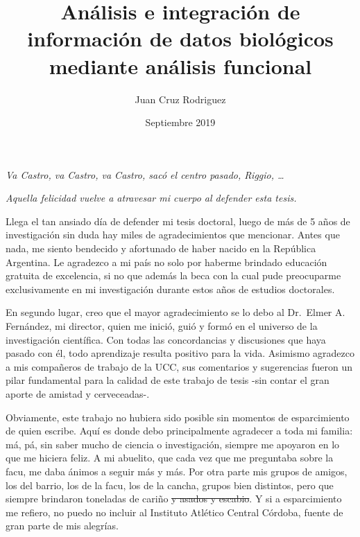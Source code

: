 \documentclass[12pt,twoside]{reedthesis}
\title{Análisis e integración de información de datos biológicos mediante análisis funcional}
\author{Juan Cruz Rodriguez}
\date{Septiembre 2019}
\begin{document}
  \maketitle

\frontmatter %
\pagestyle{empty} %
  \begin{dedication}
    \emph{Va Castro, va Castro, va Castro, sacó el centro pasado, Riggio, \ldots{}}
    
    \emph{Aquella felicidad vuelve a atravesar mi cuerpo al defender esta tesis.}
  \end{dedication}
  \begin{acknowledgements}
    \par
    
    Llega el tan ansiado día de defender mi tesis doctoral, luego de más de 5 años de investigación sin duda hay miles de agradecimientos que mencionar. Antes que nada, me siento bendecido y afortunado de haber nacido en la República Argentina. Le agradezco a mi país no solo por haberme brindado educación gratuita de excelencia, si no que además la beca con la cual pude preocuparme exclusivamente en mi investigación durante estos años de estudios doctorales.
    
    \par
    
    En segundo lugar, creo que el mayor agradecimiento se lo debo al Dr.~Elmer A. Fernández, mi director, quien me inició, guió y formó en el universo de la investigación científica. Con todas las concordancias y discusiones que haya pasado con él, todo aprendizaje resulta positivo para la vida. Asimismo agradezco a mis compañeros de trabajo de la UCC, sus comentarios y sugerencias fueron un pilar fundamental para la calidad de este trabajo de tesis -sin contar el gran aporte de amistad y cerveceadas-.
    
    \par
    
    Obviamente, este trabajo no hubiera sido posible sin momentos de esparcimiento de quien escribe. Aquí es donde debo principalmente agradecer a toda mi familia: má, pá, sin saber mucho de ciencia o investigación, siempre me apoyaron en lo que me hiciera feliz. A mi abuelito, que cada vez que me preguntaba sobre la facu, me daba ánimos a seguir más y más. Por otra parte mis grupos de amigos, los del barrio, los de la facu, los de la cancha, grupos bien distintos, pero que siempre brindaron toneladas de cariño \sout{y asados y escabio}. Y si a esparcimiento me refiero, no puedo no incluir al Instituto Atlético Central Córdoba, fuente de gran parte de mis alegrías.
    

\end{acknowledgements}
\end{document}
